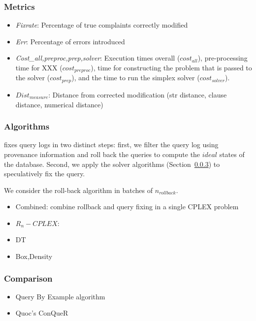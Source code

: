 \subsubsection{Metrics}

\begin{itemize}
\item {\it Fixrate}: Percentage of true complaints correctly modified
\item {\it Err}: Percentage of errors introduced
\item {\it Cost_{all,preproc,prep,solver}}: Execution times overall ($cost_{all}$), 
      pre-processing time for XXX ($cost_{preproc}$), time for constructing the problem that is
      passed to the solver ($cost_{prep}$), and the time to run the simplex solver ($cost_{solver}$).
\item {\it $Dist_{measure}$}: Distance from corrected modification  
      (str distance, clause distance, numerical distance)
\end{itemize}

\subsubsection{Algorithms}

\sys fixes query logs in two distinct steps: first, we filter the query log using 
provenance information and roll back the queries to compute the $ideal$ states of the database.
Second, we apply the solver algorithms (Section~\ref{}) to speculatively fix the query.

We consider the roll-back algorithm in batches of $n_{rollback}$.

\begin{itemize}
\item Combined:  combine rollback and query fixing in a single CPLEX problem
\item $R_n-CPLEX$: 
\item DT
\item Box,Density
\end{itemize}



\subsubsection{Comparison}

\begin{itemize}
\item Query By Example algorithm
\item Quoc's ConQueR
\end{itemize}

